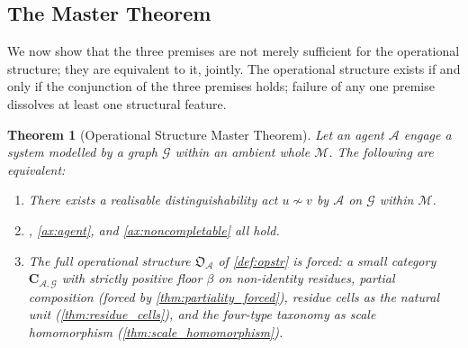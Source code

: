 \documentclass[11pt,a4paper]{article}
\theoremstyle{thmstyle}
\newtheorem{theorem}{Theorem}[section]
\theoremstyle{definition}
\theoremstyle{remark}
\newcommand{\Graph}{\mathcal{G}}
\newcommand{\Agent}{\mathcal{A}}
\newcommand{\floor}{\beta}
\newcommand{\OpStr}{\mathfrak{O}}
\begin{document}
\subsection{The Master Theorem}

We now show that the three premises are not merely sufficient for
the operational structure; they are equivalent to it, jointly. The
operational structure exists if and only if the conjunction of the
three premises holds; failure of any one premise dissolves at
least one structural feature.

\begin{theorem}[Operational Structure Master Theorem]
\label{thm:master}
Let an agent $\Agent$ engage a system modelled by a graph $\Graph$
within an ambient whole $\mathcal{M}$. The following are
equivalent:
\begin{enumerate}[label=\textup{(\roman*)},leftmargin=2.2em]
\item There exists a realisable distinguishability act
$u \not\sim v$ by $\Agent$ on $\Graph$ within $\mathcal{M}$.
\item {}, \cref{ax:agent}, and
\cref{ax:noncompletable} all hold.
\item The full operational structure $\OpStr_\Agent$ of
\cref{def:opstr} is forced: a small category
$\mathbf{C}_{\Agent,\Graph}$ with strictly positive floor $\floor$
on non-identity residues, partial composition (forced by
\cref{thm:partiality_forced}), residue cells as the natural unit
(\cref{thm:residue_cells}), and the four-type taxonomy as scale
homomorphism (\cref{thm:scale_homomorphism}).
\end{enumerate}
\end{theorem}
\end{document}
